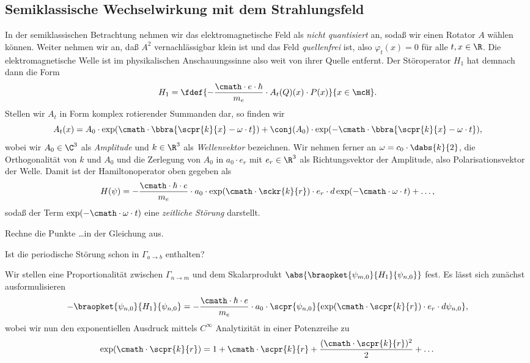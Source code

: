 \documentclass{subfile}
\begin{document}
    
    \subsection{Semiklassische Wechselwirkung mit dem Strahlungsfeld}
        In der semiklassischen Betrachtung nehmen wir das elektromagnetische Feld als \emph{nicht quantisiert} an, sodaß wir einen Rotator $A$ wählen können. Weiter nehmen wir an, daß $A^2$ vernachlässigbar klein ist und das Feld \emph{quellenfrei} ist, also $\varphi_t(x) = 0$ für alle $t,x\in\R$. Die elektromagnetische Welle ist im physikalischen Anschauungssinne also weit von ihrer Quelle entfernt. Der Störoperator $H_1$ hat demnach dann die Form 
        \[
            H_1 = \fdef{-\frac{\cmath\cdot e\cdot\hbar}{m_e}\cdot A_t(Q)(x)\cdot P(x)}{x\in\mcH}.
        \]
        Stellen wir $A_t$ in Form komplex rotierender Summanden dar, so finden wir
        \[
            A_t(x) = A_0\cdot\exp(\cmath\cdot \bbra{\scpr{k}{x} - \omega\cdot t}) + \conj(A_0)\cdot\exp(-\cmath\cdot\bbra{\scpr{k}{x} - \omega\cdot t}),
        \]
        wobei wir $A_0\in\C^3$ als \emph{Amplitude} und $k\in\R^3$ als \emph{Wellenvektor} bezeichnen. Wir nehmen ferner an $\omega = c_0\cdot\dabs{k}{2}$, die Orthogonalität von $k$ und $A_0$ und die Zerlegung von $A_0$ in $a_0\cdot e_r$ mit $e_r\in\R^3$ als Richtungsvektor der Amplitude, also Polarisationsvektor der Welle. Damit ist der Hamiltonoperator oben gegeben als
        \[
            H(\psi) = -\frac{\cmath\cdot\hbar\cdot e}{m_e}\cdot a_0\cdot\exp(\cmath\cdot\sckr{k}{r})\cdot e_r\cdot d\exp(-\cmath\cdot\omega\cdot t) + \dots,
        \] 
        sodaß der Term $\exp(-\cmath\cdot\omega\cdot t)$ eine \emph{zeitliche Störung} darstellt. 
        \begin{Aufgabe}
            \nr{} Rechne die Punkte \dots in der Gleichung aus. 

            \nr{} Ist die periodische Störung schon in $\Gamma_{a\to b}$ enthalten?
        \end{Aufgabe}
        \noindent Wir stellen eine Proportionalität zwischen $\Gamma_{n\to m}$ und dem Skalarprodukt $\abs{\braopket{\psi_{m,0}}{H_1}{\psi_{n,0}}}$ fest. Es lässt sich zunächst ausformulisieren
        \[
            -\braopket{\psi_{n,0}}{H_1}{\psi_{n,0}} = -\frac{\cmath\cdot\hbar\cdot e}{m_e}\cdot a_0\cdot\scpr{\psi_{n,0}}{\exp(\cmath\cdot\scpr{k}{r})\cdot e_r\cdot d\psi_{n,0}},
        \]
        wobei wir nun den exponentiellen Ausdruck mittels $C^\infty$ Analytizität in einer Potenzreihe zu 
        \[
            \exp(\cmath\cdot\scpr{k}{r}) = 1 + \cmath\cdot\scpr{k}{r} + \frac{(\cmath\cdot\scpr{k}{r})^2}{2} + \dots
        \]
\end{document}
